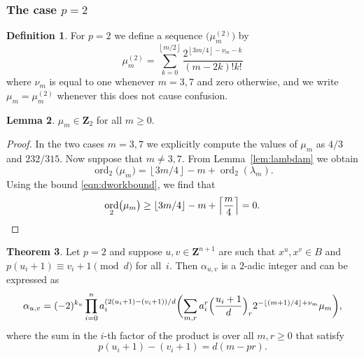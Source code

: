 \documentclass[a4paper,11pt]{article}
\numberwithin{equation}{section}
\providecommand{\floor}[1]{\left\lfloor#1\right\rfloor}   %
\providecommand{\ceil}[1]{\left\lceil#1\right\rceil}   %
\newcommand{\ZZ}{\mathbf{Z}} %
\DeclareMathOperator{\ord}{ord}          %
\theoremstyle{definition}
\newtheorem{thm}{Theorem}[section]
\newtheorem{lem}[thm]{Lemma}
\newtheorem{defn}[thm]{Definition}
\begin{document}
\subsubsection{The case $p = 2$}

\begin{defn} \label{defn:mu2}
For $p = 2$ we define a sequence $\bigl(\mu_m^{(2)}\bigr)$ by 
\begin{equation*}
\mu_m^{(2)} = 
    \sum_{k=0}^{\floor{m/2}} \frac{2^{\floor{3m/4} - \nu_m - k}}{(m-2k)! k!}
\end{equation*}
where $\nu_m$ is equal to one whenever $m = 3, 7$ and zero otherwise, 
and we write $\mu_m =\mu_m^{(2)}$ whenever this does not cause confusion. 
\end{defn}

\begin{lem} \label{lem:mu2}
$\mu_m \in \ZZ_2$ for all $m \geq 0$.
\end{lem}

\begin{proof}
In the two cases $m = 3, 7$ we explicitly compute the values of 
$\mu_m$ as $4/3$ and $232/315$.  Now suppose that $m \neq 3, 7$. 
From Lemma~\ref{lem:lambdam} we obtain 
\begin{equation*}
\ord_2 \bigl(\mu_m\bigr) 
    = \floor{3m/4} - m + \ord_2(\lambda_m).
\end{equation*}
Using the bound \eqref{eqn:dworkbound}, we find that 
\begin{equation*}
\ord_2 \bigl(\mu_m\bigr) 
    \geq \floor{3m/4} - m + \ceil{\frac{m}{4}} = 0. \qedhere
\end{equation*}
\end{proof}

\begin{thm} \label{thm:alpha2}
Let $p = 2$ and suppose $u, v \in \ZZ^{n+1}$ are such that 
$x^u, x^v \in B$ and $p (u_i + 1) \equiv v_i + 1 \pmod{d}$ 
for all~$i$.  Then $\alpha_{u,v}$ is a $2$-adic integer and can be expressed as 
\begin{equation*}
\alpha_{u,v} = (-2)^{k_u} \prod_{i=0}^n a_i^{(2 (u_i + 1) - (v_i + 1))/d} \biggl( \sum_{m,r} a_i^{r} \Bigl(\frac{u_i+1}{d}\Bigr)_r 2^{-\floor{(m+1)/4}+\nu_m} \mu_m \biggr), 
\end{equation*}
where the sum in the $i$-th factor of the product is over all $m, r \geq 0$  
that satisfy
\[
p(u_i+1)-(v_i+1)=d(m-pr).
\]
\end{thm}
\end{document}

